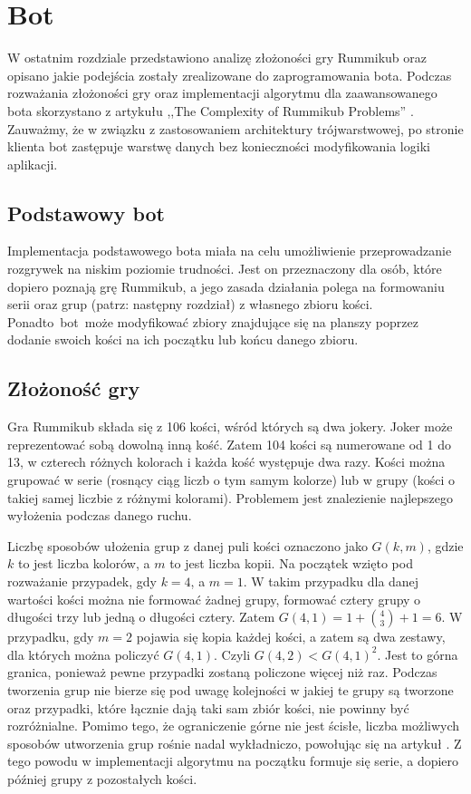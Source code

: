 \chapter{Bot}
\thispagestyle{chapterBeginStyle}

W ostatnim rozdziale przedstawiono analizę złożoności gry Rummikub oraz opisano jakie podejścia zostały zrealizowane do zaprogramowania bota. Podczas rozważania złożoności gry oraz implementacji algorytmu dla zaawansowanego bota skorzystano z artykułu ,,The Complexity of Rummikub Problems'' \cite{RummikubComplexity}. 
Zauważmy, że w związku z zastosowaniem architektury trójwarstwowej, po stronie klienta bot zastępuje  warstwę danych bez konieczności modyfikowania logiki aplikacji.

\section{Podstawowy bot}

Implementacja podstawowego bota miała na celu umożliwienie przeprowadzanie rozgrywek na niskim poziomie trudności. Jest on przeznaczony dla osób, które dopiero poznają grę Rummikub, a jego zasada działania polega na formowaniu serii oraz grup (patrz: następny rozdział) z własnego zbioru kości. \mbox{Ponadto bot może} modyfikować zbiory znajdujące się na planszy poprzez dodanie swoich kości na ich początku lub końcu danego zbioru.

\section{Złożoność gry}

Gra Rummikub składa się z 106 kości, wśród których są dwa jokery. 
Joker może reprezentować sobą dowolną inną kość. Zatem 104 kości są numerowane od 1 do 13, w czterech różnych kolorach i każda kość występuje dwa razy. Kości można grupować w serie (rosnący ciąg liczb o tym samym kolorze) lub w grupy (kości o takiej samej liczbie z różnymi kolorami). Problemem jest znalezienie najlepszego wyłożenia podczas danego ruchu. 

 Liczbę sposobów ułożenia grup z danej puli kości oznaczono jako $G(k, m)$, gdzie $k$ to jest liczba kolorów, a $m$ to jest liczba kopii. Na początek wzięto pod rozważanie przypadek, gdy $k = 4$, a $m = 1$. W takim przypadku dla danej wartości kości można nie formować żadnej grupy, formować cztery grupy o długości trzy lub jedną o długości cztery. Zatem $G(4,1) = 1 + {{4}\choose{3}} + 1 = 6$. W przypadku, gdy $m = 2$ pojawia się kopia każdej kości, a zatem są dwa zestawy, dla których można policzyć $G(4,1)$. Czyli $G(4,2) < G(4,1)^2$. Jest to górna granica, ponieważ pewne przypadki zostaną policzone więcej niż raz. Podczas tworzenia grup nie bierze się pod uwagę kolejności w jakiej te grupy są tworzone oraz przypadki, które łącznie dają taki sam zbiór kości, nie powinny być rozróżnialne. Pomimo tego, że ograniczenie górne nie jest ścisłe, liczba możliwych sposobów utworzenia grup rośnie nadal wykładniczo, powołując się na artykuł \cite{RummikubComplexity}. Z tego powodu w implementacji algorytmu na początku formuje się serie, a dopiero później grupy z pozostałych kości. 

